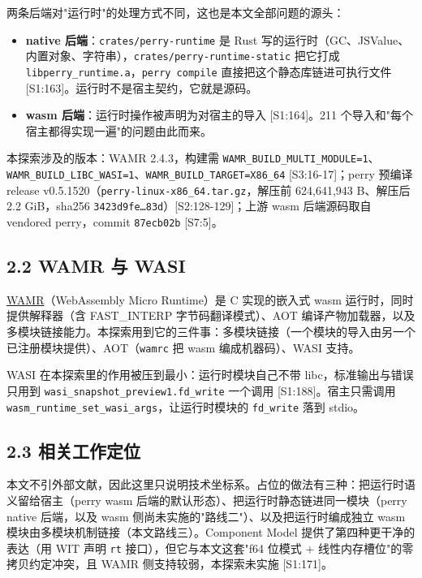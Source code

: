 \documentclass[11pt, a4paper]{article}
\begin{document}
两条后端对"运行时"的处理方式不同，这也是本文全部问题的源头：


\begin{itemize}
\item \textbf{native 后端}：\texttt{crates/perry-runtime} 是 Rust 写的运行时（GC、JSValue、内置对象、字符串），\texttt{crates/perry-runtime-static} 把它打成 \texttt{libperry\_runtime.a}，\texttt{perry compile} 直接把这个静态库链进可执行文件 [S1:163]。运行时不是宿主契约，它就是源码。
\item \textbf{wasm 后端}：运行时操作被声明为对宿主的导入 [S1:164]。211 个导入和"每个宿主都得实现一遍"的问题由此而来。
\end{itemize}

本探索涉及的版本：WAMR 2.4.3，构建需 \texttt{WAMR\_BUILD\_MULTI\_MODULE=1}、\texttt{WAMR\_BUILD\_LIBC\_WASI=1}、\texttt{WAMR\_BUILD\_TARGET=X86\_64} [S3:16-17]；perry 预编译 release v0.5.1520（\texttt{perry-linux-x86\_64.tar.gz}，解压前 624,641,943 B、解压后 2.2 GiB，sha256 \texttt{3423d9fe…83d}）[S2:128-129]；上游 wasm 后端源码取自 vendored perry，commit \texttt{87ecb02b} [S7:5]。


\subsection{2.2 WAMR 与 WASI}

\href{https://github.com/bytecodealliance/wasm-micro-runtime}{WAMR}（WebAssembly Micro Runtime）是 C 实现的嵌入式 wasm 运行时，同时提供解释器（含 FAST\_INTERP 字节码翻译模式）、AOT 编译产物加载器，以及多模块链接能力。本探索用到它的三件事：多模块链接（一个模块的导入由另一个已注册模块提供）、AOT（\texttt{wamrc} 把 wasm 编成机器码）、WASI 支持。


WASI 在本探索里的作用被压到最小：运行时模块自己不带 libc，标准输出与错误只用到 \texttt{wasi\_snapshot\_preview1.fd\_write} 一个调用 [S1:188]。宿主只需调用 \texttt{wasm\_runtime\_set\_wasi\_args}，让运行时模块的 \texttt{fd\_write} 落到 stdio。


\subsection{2.3 相关工作定位}

本文不引外部文献，因此这里只说明技术坐标系。占位的做法有三种：把运行时语义留给宿主（perry wasm 后端的默认形态）、把运行时静态链进同一模块（perry native 后端，以及 wasm 侧尚未实施的"路线二"）、以及把运行时编成独立 wasm 模块由多模块机制链接（本文路线三）。Component Model 提供了第四种更干净的表达（用 WIT 声明 \texttt{rt} 接口），但它与本文这套"f64 位模式 + 线性内存槽位"的零拷贝约定冲突，且 WAMR 侧支持较弱，本探索未实施 [S1:171]。
\end{document}
